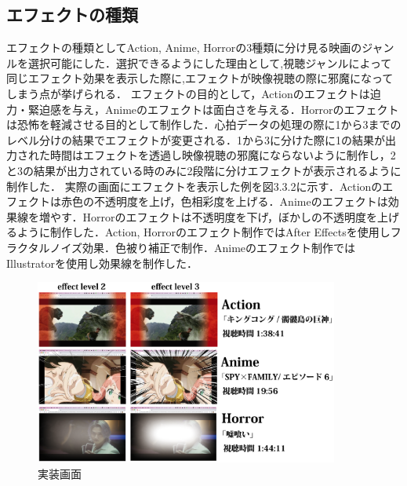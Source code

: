 \subsection{エフェクトの種類}
エフェクトの種類としてAction, Anime, Horrorの3種類に分け見る映画のジャンルを選択可能にした．選択できるようにした理由として,視聴ジャンルによって同じエフェクト効果を表示した際に,エフェクトが映像視聴の際に邪魔になってしまう点が挙げられる．
エフェクトの目的として，Actionのエフェクトは迫力・緊迫感を与え，Animeのエフェクトは面白さを与える．Horrorのエフェクトは恐怖を軽減させる目的として制作した．心拍データの処理の際に1から3までのレベル分けの結果でエフェクトが変更される．1から3に分けた際に1の結果が出力された時間はエフェクトを透過し映像視聴の邪魔にならないように制作し，2と3の結果が出力されている時のみに2段階に分けエフェクトが表示されるように制作した．
実際の画面にエフェクトを表示した例を図3.3.2に示す．Actionのエフェクトは赤色の不透明度を上げ，色相彩度を上げる．Animeのエフェクトは効果線を増やす．Horrorのエフェクトは不透明度を下げ，ぼかしの不透明度を上げるように制作した．Action, Horrorのエフェクト制作ではAfter Effectsを使用しフラクタルノイズ効果．色被り補正で制作．Animeのエフェクト制作ではIllustratorを使用し効果線を制作した．
\begin{figure}[H]
    \centering
    \includegraphics[width=10cm]{images/chapter3/effectjissou.jpg}
    \caption{実装画面}
    \label{abst}
\end{figure}
